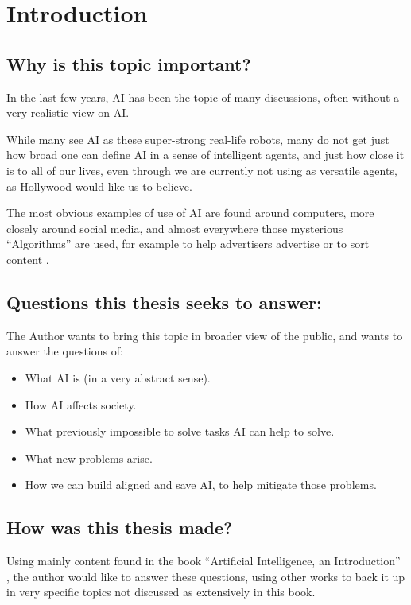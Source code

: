\chapter{Introduction}
\section{Why is this topic important?}
In the last few years, AI has been the topic of many discussions, often without a very realistic view on AI.

While many see AI as these super-strong real-life robots, many do not get just how broad one can define AI in a sense of intelligent agents, and just how close it is to all of our lives, even through we are currently not using as versatile agents, as Hollywood would like us to believe.

The most obvious examples of use of AI are found around computers, more closely around social media, and almost everywhere those mysterious “Algorithms” are used, for example to help advertisers advertise \cite{facebookWerbungAufInstagram} or to sort content \cite{googleFunktioniertGoogleSucheSuchalgorithmen}.
\section{Questions this thesis seeks to answer:}
The Author wants to bring this topic in broader view of the public, and wants to answer the questions of: 
\begin{itemize}
    \item What AI is (in a very abstract sense).
    \item How AI affects society.
    \item What previously impossible to solve tasks AI can help to solve.
    \item What new problems arise.
    \item How we can build aligned and save AI, to help mitigate those problems.
\end{itemize}
\section{How was this thesis made?}
Using mainly content found in the book “Artificial Intelligence, an Introduction” \cite{russellArtificialIntelligenceModern2010}, the author would like to answer these questions, using other works to back it up in very specific topics not discussed as extensively in this book.